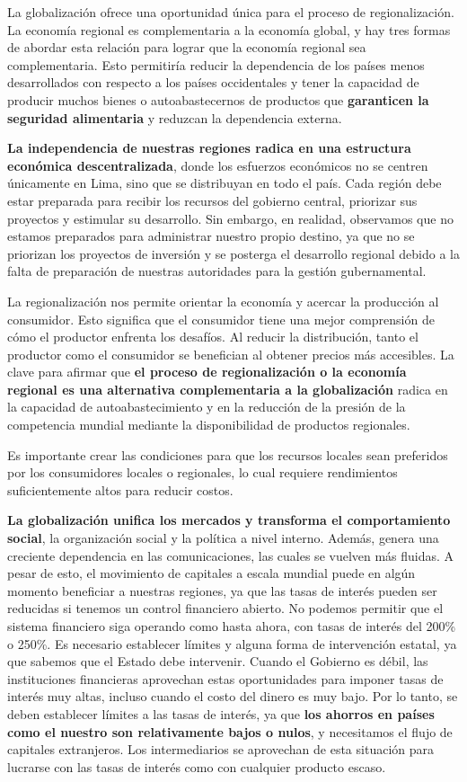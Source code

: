 \documentclass[
  a4paper,
]{article}
\begin{document}
La globalización ofrece una oportunidad única para el proceso de
regionalización. La economía regional es complementaria a la economía
global, y hay tres formas de abordar esta relación para lograr que la
economía regional sea complementaria. Esto permitiría reducir la
dependencia de los países menos desarrollados con respecto a los países
occidentales y tener la capacidad de producir muchos bienes o
autoabastecernos de productos que \textbf{garanticen la seguridad
alimentaria} y reduzcan la dependencia externa.

\textbf{La independencia de nuestras regiones radica en una estructura
económica descentralizada}, donde los esfuerzos económicos no se centren
únicamente en Lima, sino que se distribuyan en todo el país. Cada región
debe estar preparada para recibir los recursos del gobierno central,
priorizar sus proyectos y estimular su desarrollo. Sin embargo, en
realidad, observamos que no estamos preparados para administrar nuestro
propio destino, ya que no se priorizan los proyectos de inversión y se
posterga el desarrollo regional debido a la falta de preparación de
nuestras autoridades para la gestión gubernamental.

La regionalización nos permite orientar la economía y acercar la
producción al consumidor. Esto significa que el consumidor tiene una
mejor comprensión de cómo el productor enfrenta los desafíos. Al reducir
la distribución, tanto el productor como el consumidor se benefician al
obtener precios más accesibles. La clave para afirmar que \textbf{el
proceso de regionalización o la economía regional es una alternativa
complementaria a la globalización} radica en la capacidad de
autoabastecimiento y en la reducción de la presión de la competencia
mundial mediante la disponibilidad de productos regionales.

Es importante crear las condiciones para que los recursos locales sean
preferidos por los consumidores locales o regionales, lo cual requiere
rendimientos suficientemente altos para reducir costos.

\textbf{La globalización unifica los mercados y transforma el
comportamiento social}, la organización social y la política a nivel
interno. Además, genera una creciente dependencia en las comunicaciones,
las cuales se vuelven más fluidas. A pesar de esto, el movimiento de
capitales a escala mundial puede en algún momento beneficiar a nuestras
regiones, ya que las tasas de interés pueden ser reducidas si tenemos un
control financiero abierto. No podemos permitir que el sistema
financiero siga operando como hasta ahora, con tasas de interés del
200\% o 250\%. Es necesario establecer límites y alguna forma de
intervención estatal, ya que sabemos que el Estado debe intervenir.
Cuando el Gobierno es débil, las instituciones financieras aprovechan
estas oportunidades para imponer tasas de interés muy altas, incluso
cuando el costo del dinero es muy bajo. Por lo tanto, se deben
establecer límites a las tasas de interés, ya que \textbf{los ahorros en
países como el nuestro son relativamente bajos o nulos}, y necesitamos
el flujo de capitales extranjeros. Los intermediarios se aprovechan de
esta situación para lucrarse con las tasas de interés como con cualquier
producto escaso.
\end{document}
